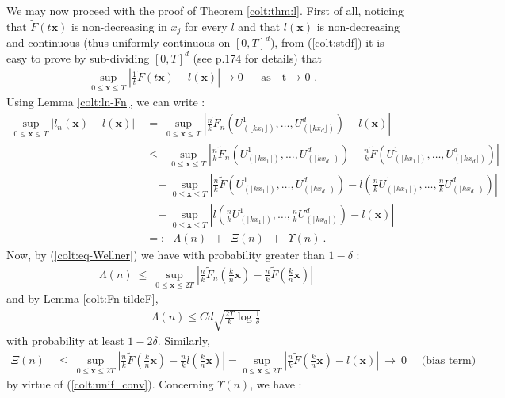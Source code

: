  We may now proceed with the proof of Theorem \ref{colt:thm:l}.
First of all, noticing that $\tilde F(t\mathbf{x})$ is non-decreasing in $x_j$ for every $l$ and that $l(\mathbf{x})$ is non-decreasing and continuous (thus uniformly continuous on $[0,T]^d$), from (\ref{colt:stdf}) it is easy to prove by sub-dividing $[0,T]^d$ (see \cite{Qi97} p.174 for details) that 
\begin{align}
\label{colt:unif_conv}
\sup_{0 \le \mathbf{x} \le T}\left| \frac{1}{t} \tilde F ( t \mathbf{x})-l(\mathbf{x}) \right|  \to 0 \text{~~~ as~~ t $\to$ 0 . }
\end{align}
\noindent
Using Lemma \ref{colt:ln-Fn}, we can write :
\begin{align*}
\sup_{0 \le \mathbf{x} \le T} \left| l_n(\mathbf{x}) - l(\mathbf{x}) \right| &~=~ \sup_{0 \le \mathbf{x} \le T} \left| \frac{n}{k} \tilde F_n \left( U_{(\lfloor kx_1\rfloor )}^1,\ldots, U_{(\lfloor kx_d\rfloor )}^d \right) - l(\mathbf{x}) \right| \\
& ~\le~~~ \sup_{0 \le \mathbf{x} \le T} \left| \frac{n}{k} \tilde F_n \left(U_{(\lfloor kx_1\rfloor )}^1,\ldots, U_{(\lfloor kx_d\rfloor )}^d \right) - \frac{n}{k} \tilde F \left(U_{(\lfloor kx_1\rfloor )}^1,\ldots, U_{(\lfloor kx_d\rfloor )}^d \right)  \right| 
\\&~~~~~ + \sup_{0 \le \mathbf{x} \le T} \left| \frac{n}{k} \tilde F \left(U_{(\lfloor kx_1\rfloor )}^1,\ldots, U_{(\lfloor kx_d\rfloor )}^d \right) - l \left(\frac{n}{k} U_{(\lfloor kx_1\rfloor )}^1,\ldots, \frac{n}{k} U_{(\lfloor kx_d\rfloor )}^d \right) \right|
\\&~~~~~ + \sup_{0 \le \mathbf{x} \le T} \left| l \left(\frac{n}{k} U_{(\lfloor kx_1\rfloor )}^1, \ldots,\frac{n}{k} U_{(\lfloor kx_d\rfloor )}^d \right) - l(\mathbf{x}) \right|
\\&~=:~~~ \Lambda(n) ~~+~~ \Xi(n) ~~+~~ \Upsilon(n)~.
\end{align*}
\noindent
Now, by (\ref{colt:eq-Wellner}) we have with probability greater than $1-\delta$ :
\begin{align*} 
\Lambda(n) ~\le~ \sup_{0 \le \mathbf{x} \le 2T}\left|\frac{n}{k} \tilde F_n(\frac{k}{n}\mathbf{x})-\frac{n}{k} \tilde F ( \frac{k}{n} \mathbf{x})\right|
\end{align*}
\noindent
and by Lemma \ref{colt:Fn-tildeF}, 
\begin{align*}
 \Lambda(n) \le Cd \sqrt{\frac{2 T}{k}\log\frac{1}{\delta}}   
\end{align*}
\noindent
with probability at least $1-2\delta$. Similarly,
\begin{align*} 
\Xi(n) &~\le~  \sup_{0 \le \mathbf{x} \le  2 T}\left|\frac{n}{k}
  \tilde F(\frac{k}{n}\mathbf{x})-\frac{n}{k} l ( \frac{k}{n}
  \mathbf{x})\right| = 
 \sup_{0 \le \mathbf{x} \le  2 T} \left|\frac{n}{k}
  \tilde F(\frac{k}{n}\mathbf{x})- l (
  \mathbf{x})\right| ~\to~0 \quad\text{ (bias term)} 
\end{align*}
by virtue of (\ref{colt:unif_conv}). Concerning $\Upsilon(n)$, we have :

